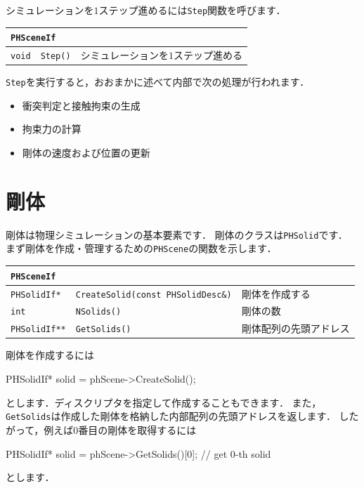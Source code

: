 \KLUDGE シミュレーションを$1$ステップ進めるには\texttt{Step}関数を呼びます．

\begin{center}
\begin{tabular}{p{.15\hsize}p{.3\hsize}p{.45\hsize}}
\multicolumn{3}{l}{\texttt{PHSceneIf}}		\\ \midrule
\texttt{void}	& \texttt{Step()}	& シミュレーションを$1$ステップ進める \\
\end{tabular}
\end{center}

\texttt{Step}を実行すると，おおまかに述べて内部で次の処理が行われます．
\begin{itemize}
\item 衝突判定と接触拘束の生成
\item 拘束力の計算
\item 剛体の速度および位置の更新
\end{itemize}

\section{剛体}

\KLUDGE 剛体は物理シミュレーションの基本要素です．
\KLUDGE 剛体のクラスは\texttt{PHSolid}です．
\KLUDGE まず剛体を作成・管理するための\texttt{PHScene}の関数を示します．

\begin{center}
\begin{tabular}{p{.15\hsize}p{.45\hsize}p{.30\hsize}}
\multicolumn{3}{l}{\texttt{PHSceneIf}}									\\ \midrule
\texttt{PHSolidIf*}		& \texttt{CreateSolid(const PHSolidDesc\&)}	& 剛体を作成する \\
\texttt{int}			& \texttt{NSolids()}						& 剛体の数 \\
\texttt{PHSolidIf**} 	& \texttt{GetSolids()}						& 剛体配列の先頭アドレス \\
\end{tabular}
\end{center}

\KLUDGE 剛体を作成するには
\begin{sourcecode}
PHSolidIf* solid = phScene->CreateSolid();
\end{sourcecode}
\KLUDGE とします．ディスクリプタを指定して作成することもできます．
\KLUDGE また，\texttt{GetSolids}は作成した剛体を格納した内部配列の先頭アドレスを返します．
\KLUDGE したがって，例えば$0$番目の剛体を取得するには
\begin{sourcecode}
PHSolidIf* solid = phScene->GetSolids()[0];      // get 0-th solid
\end{sourcecode}
\KLUDGE とします．

